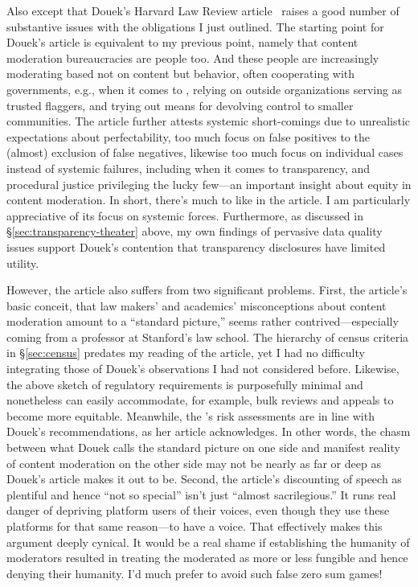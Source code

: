 Also except that Douek's Harvard Law Review article~\cite{Douek2022} raises a
good number of substantive issues with the obligations I just outlined. The
starting point for Douek's article is equivalent to my previous point, namely
that content moderation bureaucracies are people too. And these people are
increasingly moderating based not on content but behavior, often cooperating
with governments, e.g., when it comes to , relying on outside
organizations serving as trusted flaggers, and trying out means for devolving
control to smaller communities. The article further attests systemic
short-comings due to unrealistic expectations about perfectability, too much
focus on false positives to the (almost) exclusion of false negatives, likewise
too much focus on individual cases instead of systemic failures, including when
it comes to transparency, and procedural justice privileging the lucky few---an
important insight about equity in content moderation. In short, there's much to
like in the article. I am particularly appreciative of its focus on systemic
forces. Furthermore, as discussed in \S\ref{sec:transparency-theater} above, my
own findings of pervasive data quality issues support Douek's contention that
transparency disclosures have limited utility.

However, the article also suffers from two significant problems. First, the
article's basic conceit, that law makers' and academics' misconceptions about
content moderation amount to a ``standard picture,'' seems rather
contrived---especially coming from a professor at Stanford's law school. The
hierarchy of census criteria in \S\ref{sec:census} predates my reading of the
article, yet I had no difficulty integrating those of Douek's observations I had
not considered before. Likewise, the above sketch of regulatory requirements is
purposefully minimal and nonetheless can easily accommodate, for example, bulk
reviews and appeals to become more equitable. Meanwhile, the 's risk
assessments are in line with Douek's recommendations, as her article
acknowledges. In other words, the chasm between what Douek calls the standard
picture on one side and manifest reality of content moderation on the other side
may not be nearly as far or deep as Douek's article makes it out to be. Second,
the article's discounting of speech as plentiful and hence ``not so special''
isn't just ``almost sacrilegious.'' It runs real danger of depriving platform
users of their voices, even though they use these platforms for that same
reason---to have a voice. That effectively makes this argument deeply cynical.
It would be a real shame if establishing the humanity of moderators resulted in
treating the moderated as more or less fungible and hence denying their
humanity. I'd much prefer to avoid such false zero sum games!


